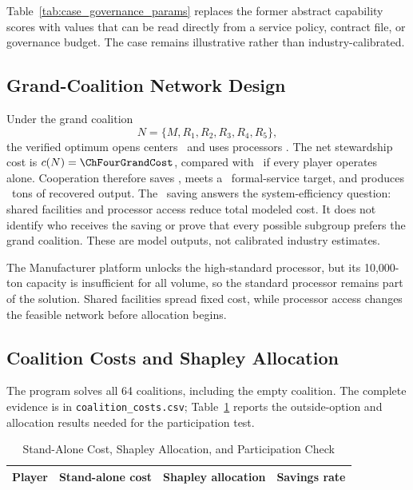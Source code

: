 Table~\ref{tab:case_governance_params} replaces the former abstract capability scores with values that can be read directly from a service policy, contract file, or governance budget. The case remains illustrative rather than industry-calibrated.

\subsection{Grand-Coalition Network Design}

Under the grand coalition
\begin{equation*}
N=\{M,R_1,R_2,R_3,R_4,R_5\},
\end{equation*}
the verified optimum opens centers \ChFourOpenCenters\ and uses processors \ChFourOpenProcessors. The net stewardship cost is $c(N)=\ChFourGrandCost$, compared with \ChFourStandaloneTotal\ if every player operates alone. Cooperation therefore saves \ChFourSavingsPercent, meets a \ChFourServiceRate\ formal-service target, and produces \ChFourRecoveredOutput\ tons of recovered output. The \ChFourSavingsPercent\ saving answers the system-efficiency question: shared facilities and processor access reduce total modeled cost. It does not identify who receives the saving or prove that every possible subgroup prefers the grand coalition. These are model outputs, not calibrated industry estimates.

The Manufacturer platform unlocks the high-standard processor, but its 10,000-ton capacity is insufficient for all volume, so the standard processor remains part of the solution. Shared facilities spread fixed cost, while processor access changes the feasible network before allocation begins.

\subsection{Coalition Costs and Shapley Allocation}

The program solves all 64 coalitions, including the empty coalition. The complete evidence is in \texttt{coalition\_costs.csv}; Table~\ref{tab:cost_comparison} reports the outside-option and allocation results needed for the participation test.

\begin{table}[htbp]
\centering
\caption{Stand-Alone Cost, Shapley Allocation, and Participation Check}
\label{tab:cost_comparison}
\begin{tabular}{lccc}
\toprule
\textbf{Player} & \textbf{Stand-alone cost} & \textbf{Shapley allocation} & \textbf{Savings rate} \\
\midrule

\end{tabular}
\end{table}

